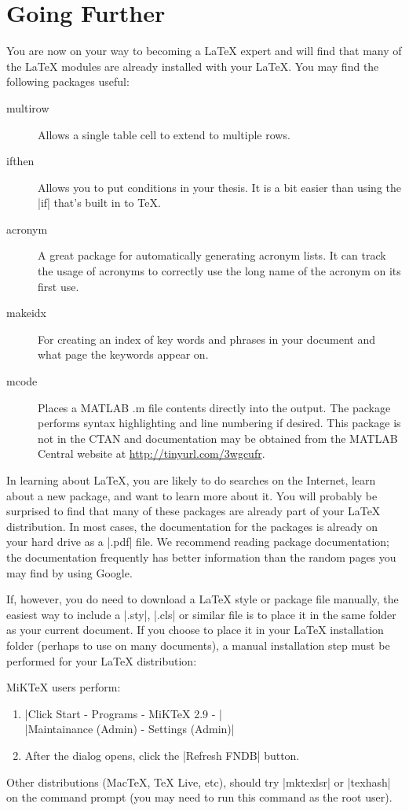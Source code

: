 \section{Going Further}

You are now on your way to becoming a \LaTeX{} expert and will find that many
of the \LaTeX{} modules are already installed with your \LaTeX{}.  You may find
the following packages useful:

\begin{description}
\item[multirow] Allows a single table cell to extend to multiple
rows.

\item[ifthen]  Allows you to put conditions in your thesis. It is a
bit easier than using the |if| that's built in to \TeX.

\item[acronym]  A great package for automatically generating acronym lists.
It can track the usage of acronyms to correctly use the long name of the acronym
on its first use.

\item[makeidx]  For creating an index of key words and phrases in your document and what page the keywords appear on.

\item[mcode]  Places a MATLAB .m file contents directly into the output.  The
package performs syntax highlighting and line numbering if desired.  This package is not in the CTAN
and documentation may be obtained from the MATLAB Central website at \url{http://tinyurl.com/3wgcufr}.

\end{description}

In learning about \LaTeX{}, you are likely to do searches on the Internet,
learn about a new package, and want to learn more about it. You will probably
be surprised to find that many of these packages are already part of your
\LaTeX{} distribution. In most cases, the documentation for the packages is
already on your hard drive as a |.pdf| file.  We recommend reading package
documentation; the documentation frequently has better information than the
random pages you may find by using Google.

If, however, you do need to download a \LaTeX{} style or package file manually,
the easiest way to include a |.sty|, |.cls| or similar file is to place it in
the same folder as your current document.  If you choose to place it in your
LaTeX installation folder (perhaps to use on many documents), a manual
installation step must be performed for your \LaTeX{} distribution:

MiKTeX users perform:
\begin{enumerate}
  \item |Click Start - Programs - MiKTeX 2.9 - | \\ 
    |Maintainance (Admin) - Settings (Admin)|
  \item After the dialog opens, click the |Refresh FNDB| button.
\end{enumerate}

Other distributions (MacTeX, TeX Live, etc), should try |mktexlsr| or |texhash|
on the command prompt (you may need to run this command as the root user).

